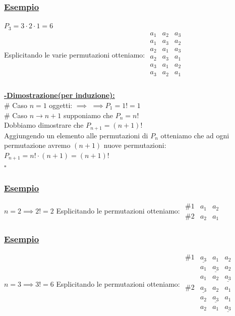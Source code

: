 \documentclass{article}
\begin{document}
\subsubsection{\underline{Esempio}}
$P_3 = 3 \cdot 2 \cdot 1 = 6$ \\
Esplicitando le varie permutazioni otteniamo: $\begin{matrix}

a_1 & a_2 & a_3 \\
a_1 & a_3 & a_2 \\
a_2 & a_1 & a_3 \\
a_2 & a_3 & a_1 \\
a_3 & a_1 & a_2 \\
a_3 & a_2 & a_1 \\

\end{matrix}$ \\ \\
\underline{\textsf{\textbf{-Dimostrazione(per induzione):}}} \\
\# Caso $n=1$ oggetti: $\implies$ $\implies P_1 = 1! = 1$ \\
\# Caso $n \rightarrow n+1$ supponiamo che $P_n = n!$ \\
Dobbiamo dimostrare che $P_{n+1} = (n+1)!$ \\
Aggiungendo un elemento alle permutazioni di $P_n$ otteniamo che ad ogni permutazione avremo $(n+1)$ nuove permutazioni: \\
$P_{n+1} = n! \cdot (n+1) = (n+1)!$ \\
\hspace*{0pt}\hfill $\square$
\subsubsection{\underline{Esempio}}
$n = 2 \implies 2! = 2$ 
Esplicitando le permutazioni otteniamo: $\begin{matrix}
\#1 & a_1 & a_2 \\
\#2 & a_2 & a_1
\end{matrix}$ 
\\
\subsubsection{\underline{Esempio}}
$n = 3 \implies 3! = 6$ 
Esplicitando le permutazioni otteniamo: $\begin{matrix}

\#1 & \underline{a_3} & a_1 & a_2 \\
& a_1 & \underline{a_3} & a_2 \\
& a_1 & a_2 & \underline{a_3} \\

\#2 & \underline{a_3} & a_2 & a_1\\
& a_2 & \underline{a_3} & a_1 \\
& a_2 & a_1 & \underline{a_3} \\

\end{matrix}$ \\
\end{document}
